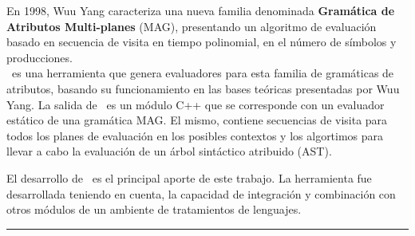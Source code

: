 \documentclass[a4paper,12pt]{ThesisStyle}
\begin{document}
\begin{vcenterpage}
En 1998, Wuu Yang caracteriza una nueva familia denominada \textbf{Gramática de Atributos Multi-planes} (MAG), presentando un algoritmo de evaluación basado en secuencia de visita en tiempo polinomial, en el número de símbolos y producciones.\\ 

\maggen\ es una herramienta que genera evaluadores para esta familia de gramáticas de atributos, basando su funcionamiento en las bases teóricas presentadas por Wuu Yang. La salida de \maggen\ es un módulo C++ que se corresponde con un evaluador estático de una gramática MAG. El mismo, contiene secuencias de visita para todos los planes de evaluación en los posibles contextos y los algortimos para llevar a cabo la evaluación de un árbol sintáctico atribuido (AST).

El desarrollo de \maggen\ es el principal aporte de este trabajo. La herramienta fue desarrollada teniendo en cuenta, la capacidad de integración y combinación con otros módulos de un ambiente de tratamientos de lenguajes.

% 

\noindent\rule[2pt]{\textwidth}{0.5pt}

\end{vcenterpage}

\tableofcontents

\mainmatter

% 
\appendix
\addappheadtotoc
\appendixpage


\listoffigures

\listoftables

\listofalgorithms
{}

% 
% 



\end{document}
